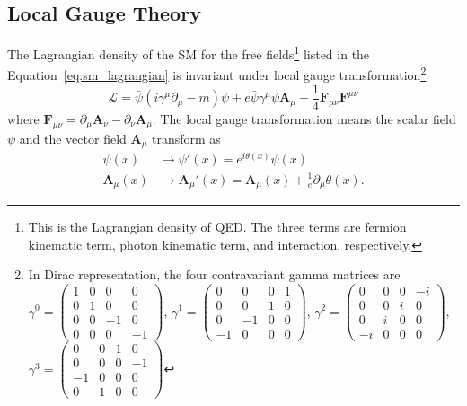 
\subsection{Local Gauge Theory}
\label{subsec:sm_gauge_theory}
The Lagrangian density of the SM for the free fields\footnote{This is the Lagrangian density of QED. The three terms are fermion kinematic term, photon kinematic term, and interaction, respectively.} listed in the Equation~\ref{eq:sm_lagrangian} is invariant under local gauge transformation\footnote{In Dirac representation, the four contravariant gamma matrices are $\gamma^{0} = \left(\begin{matrix}1 & 0 & 0 & 0\\0 & 1 & 0 & 0\\0 & 0 & -1 & 0\\0 & 0 & 0 & -1\end{matrix}\right)$, $\gamma^{1} = \left(\begin{matrix}0 & 0 & 0 & 1\\0 & 0 & 1 & 0\\0 & -1 & 0 & 0\\-1 & 0 & 0 & 0\end{matrix}\right)$, $\gamma^{2} = \left(\begin{matrix}0 & 0 & 0 & -i\\0 & 0 & i & 0\\0 & i & 0 & 0\\-i & 0 & 0 & 0\end{matrix}\right)$, $\gamma^{3} = \left(\begin{matrix}0 & 0 & 1 & 0\\0 & 0 & 0 & -1\\-1 & 0 & 0 & 0\\0 & 1 & 0 & 0\end{matrix}\right)$}
%
\begin{equation}
\mathcal{L} = \bar{\psi}(i\gamma^{\mu}\partial_{\mu} - m)\psi + e\bar{\psi}\gamma^{\mu}\psi\bm{A}_{\mu} - \frac{1}{4}\bm{F}_{\mu\nu}\bm{F}^{\mu\nu}
\label{eq:sm_lagrangian}
\end{equation}
%
where $\bm{F}_{\mu\nu} = \partial_{\mu}\bm{A}_{\nu} - \partial_{\nu}\bm{A}_{\mu}$.
The local gauge transformation means the scalar field $\psi$ and the vector field $\bm{A}_{\mu}$ transform as
%
\begin{align}
\psi(x) & \rightarrow \psi'(x) = e^{i\theta(x)}\psi(x)\\
\bm{A}_{\mu}(x) & \rightarrow \bm{A}_{\mu}'(x) = \bm{A}_{\mu}(x) + \frac{1}{e}\partial_{\mu}\theta(x).
\label{eq:sm_gauge_transformation}
\end{align}

